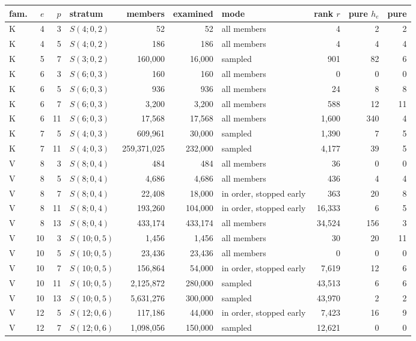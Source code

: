 \begin{tabular}{@{}lrrlrrlrrr@{}}
\toprule
fam. & $e$ & $p$ & stratum & members & examined & mode & rank $r$ & pure $h_e$ & pure\\
\midrule
K & 4 & 3 & $S(4;0,2)$ & 52 & 52 & all members & 4 & 2 & 2\\
K & 4 & 5 & $S(4;0,2)$ & 186 & 186 & all members & 4 & 4 & 4\\
K & 5 & 7 & $S(3;0,2)$ & 160{,}000 & 16{,}000 & sampled & 901 & 82 & 6\\
K & 6 & 3 & $S(6;0,3)$ & 160 & 160 & all members & 0 & 0 & 0\\
K & 6 & 5 & $S(6;0,3)$ & 936 & 936 & all members & 24 & 8 & 8\\
K & 6 & 7 & $S(6;0,3)$ & 3{,}200 & 3{,}200 & all members & 588 & 12 & 11\\
K & 6 & 11 & $S(6;0,3)$ & 17{,}568 & 17{,}568 & all members & 1{,}600 & 340 & 4\\
K & 7 & 5 & $S(4;0,3)$ & 609{,}961 & 30{,}000 & sampled & 1{,}390 & 7 & 5\\
K & 7 & 11 & $S(4;0,3)$ & 259{,}371{,}025 & 232{,}000 & sampled & 4{,}177 & 39 & 5\\
V & 8 & 3 & $S(8;0,4)$ & 484 & 484 & all members & 36 & 0 & 0\\
V & 8 & 5 & $S(8;0,4)$ & 4{,}686 & 4{,}686 & all members & 436 & 4 & 4\\
V & 8 & 7 & $S(8;0,4)$ & 22{,}408 & 18{,}000 & in order, stopped early & 363 & 20 & 8\\
V & 8 & 11 & $S(8;0,4)$ & 193{,}260 & 104{,}000 & in order, stopped early & 16{,}333 & 6 & 5\\
V & 8 & 13 & $S(8;0,4)$ & 433{,}174 & 433{,}174 & all members & 34{,}524 & 156 & 3\\
V & 10 & 3 & $S(10;0,5)$ & 1{,}456 & 1{,}456 & all members & 30 & 20 & 11\\
V & 10 & 5 & $S(10;0,5)$ & 23{,}436 & 23{,}436 & all members & 0 & 0 & 0\\
V & 10 & 7 & $S(10;0,5)$ & 156{,}864 & 54{,}000 & in order, stopped early & 7{,}619 & 12 & 6\\
V & 10 & 11 & $S(10;0,5)$ & 2{,}125{,}872 & 280{,}000 & sampled & 43{,}513 & 6 & 6\\
V & 10 & 13 & $S(10;0,5)$ & 5{,}631{,}276 & 300{,}000 & sampled & 43{,}970 & 2 & 2\\
V & 12 & 5 & $S(12;0,6)$ & 117{,}186 & 44{,}000 & in order, stopped early & 7{,}423 & 16 & 9\\
V & 12 & 7 & $S(12;0,6)$ & 1{,}098{,}056 & 150{,}000 & sampled & 12{,}621 & 0 & 0\\

\end{tabular}
